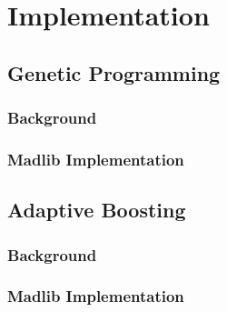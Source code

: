 
\section{Implementation}
\label{sec:imp}
\subsection{Genetic Programming}
\subsubsection{Background}
\subsubsection{Madlib Implementation}
\subsection{Adaptive Boosting}
\subsubsection{Background}
\subsubsection{Madlib Implementation}
